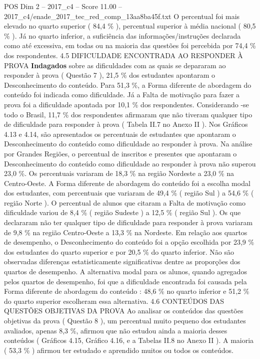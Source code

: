 \begin{textsample}{POS Dim 2 – 2017\_c4 – Score 11.00 – 2017\_c4/enade\_2017\_tec\_red\_comp\_13aa8ba45f.txt}
O percentual foi mais elevado no quarto superior ( 84,4 \% ), percentual superior à média nacional ( 80,5 \% ).
Já no quarto inferior, a suficiência das informações/instruções declarada como até excessiva, em todas ou na maioria das questões foi percebida por 74,4 \% dos respondentes. 4.5 DIFICULDADE ENCONTRADA AO RESPONDER À PROVA \textbf{Indagados} sobre as dificuldades com as quais se depararam ao responder à prova ( Questão 7 ), 21,5 \% dos estudantes apontaram o Desconhecimento do conteúdo.
Para 51,3 \%, a Forma diferente de abordagem do conteúdo foi indicada como dificuldade.
Já a Falta de motivação para fazer a prova foi a dificuldade apontada por 10,1 \% dos respondentes.
Considerando -se todo o Brasil, 11,7 \% dos respondentes afirmaram que não tiveram qualquer tipo de dificuldade para responder à prova ( Tabela II.7 no Anexo II ).
Nos Gráficos 4.13 e 4.14, são apresentados os percentuais de estudantes que apontaram o Desconhecimento do conteúdo como dificuldade ao responder à prova.
Na análise por Grandes Regiões, o percentual de inscritos e presentes que apontaram o Desconhecimento do conteúdo como dificuldade ao responder à prova não superou 23,0 \%.
Os percentuais variaram de 18,3 \% na região Nordeste a 23,0 \% na Centro-Oeste.
A Forma diferente de abordagem do conteúdo foi a escolha modal dos estudantes, com percentuais que variaram de 49,4 \% ( região Sul ) a 54,6 \% ( região Norte ).
O percentual de alunos que citaram a Falta de motivação como dificuldade variou de 8,4 \% ( região Sudeste ) a 12,5 \% ( região Sul ).
Os que declararam não ter qualquer tipo de dificuldade para responder à prova variaram de 9,8 \% na região Centro-Oeste a 13,3 \% na Nordeste.
Em relação aos quartos de desempenho, o Desconhecimento do conteúdo foi a opção escolhida por 23,9 \% dos estudantes do quarto superior e por 20,5 \% do quarto inferior.
Não são observadas diferenças estatisticamente significativas dentre as proporções dos quartos de desempenho.
A alternativa modal para os alunos, quando agregados pelos quartos de desempenho, foi que a dificuldade encontrada foi causada pela Forma diferente de abordagem do conteúdo : 48,6 \% no quarto inferior e 51,2 \% do quarto superior escolheram essa alternativa. 4.6 CONTEÚDOS DAS QUESTÕES OBJETIVAS DA PROVA Ao analisar os conteúdos das questões objetivas da prova ( Questão 8 ), um percentual muito pequeno dos estudantes avaliados, apenas 8,3 \%, afirmou que não estudou ainda a maioria desses conteúdos ( Gráficos 4.15, Gráfico 4.16, e a Tabelas II.8 no Anexo II ).
A maioria ( 53,3 \% ) afirmou ter estudado e aprendido muitos ou todos os conteúdos.

\end{textsample}
